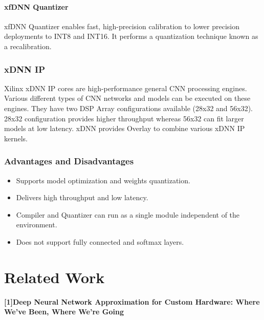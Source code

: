\documentclass[titlepage]{report}
\begin{document}
\subsubsection{xfDNN Quantizer} 

xfDNN Quantizer enables fast, high-precision calibration to lower precision deployments to INT8 and INT16. It performs a quantization technique known as a recalibration.

\subsection{xDNN IP}
Xilinx xDNN IP cores are high-performance general CNN processing engines. Various different types of CNN networks and models can be executed on these engines. They have two DSP Array configurations available (28x32 and 56x32). 28x32 configuration provides higher throughput whereas 56x32 can fit larger models at low latency.
xDNN provides Overlay to combine various xDNN IP kernels.

\subsection{Advantages and Disadvantages}
  
 \begin{itemize}
 \item Supports model optimization and weights quantization.
 \item Delivers high throughput and low latency.
 \item Compiler and Quantizer can run as a single module independent of the environment.
 \item Does not support fully connected and softmax layers.
 
 \end{itemize}




\chapter{Related Work}
\textbf{[1]Deep Neural Network Approximation for Custom Hardware: Where We've Been, Where We're Going}
\end{document}
